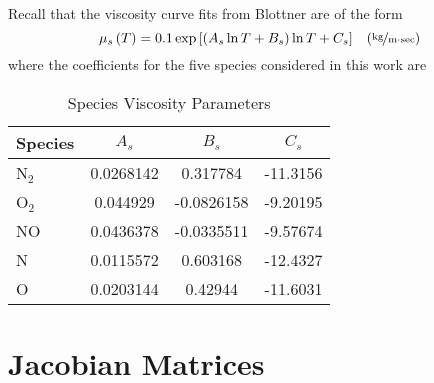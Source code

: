 Recall that the viscosity curve fits from Blottner are of the form
\begin{equation}
  \mu_s\left(T\right) = 0.1 \exp\left[\left(A_s \ln T + B_s\right) \ln T + C_s\right] \;\;\; \left(\unitfrac{kg}{m\cdot sec}\right)
\end{equation}
where the coefficients for the five species considered in this work are~\cite{wright_thesis}
\begin{table}[hbtp]
  \begin{center}
    \caption{Species Viscosity Parameters}
    \vspace{1em}
    \begin{tabular}{|l|ccc|} \hline
      Species  & $A_s$ & $B_s$ & $C_s$ \\ \hline \hline
      N$_2$ & 0.0268142 & 0.317784   & -11.3156 \\
      O$_2$ & 0.044929  & -0.0826158 & -9.20195 \\
      NO    & 0.0436378 & -0.0335511 & -9.57674 \\
      N     & 0.0115572 & 0.603168   & -12.4327 \\
      O     & 0.0203144 & 0.42944    & -11.6031 \\ \hline
    \end{tabular}
  \end{center}
\end{table}



\clearpage
\section{Jacobian Matrices}
